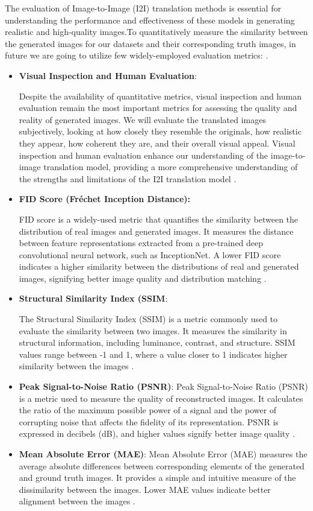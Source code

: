 \documentclass[UKenglish,12pt]{master-style}
\begin{document}
The evaluation of Image-to-Image (I2I) translation methods is essential for understanding the performance and effectiveness of these models in generating realistic and high-quality images.To quantitatively measure the similarity between the generated images for our datasets and their corresponding truth images, in future we are going to utilize few widely-employed evaluation metrics: .
\begin{itemize}

\item \textbf{Visual Inspection and Human Evaluation}:

Despite the availability of quantitative metrics, visual inspection and human evaluation remain the most important metrics for assessing the quality and reality of generated images. We will evaluate the translated images subjectively, looking at how closely they resemble the originals, how realistic they appear, how coherent they are, and their overall visual appeal. Visual inspection and human evaluation enhance our understanding of the image-to-image translation model, providing a more comprehensive understanding of the strengths and limitations of the I2I translation model \cite{I2I} .

\item \textbf{FID Score (Fréchet Inception Distance):}

FID score is a widely-used metric that quantifies the similarity between the distribution of real images and generated images. It measures the distance between feature representations extracted from a pre-trained deep convolutional neural network, such as InceptionNet. A lower FID score indicates a higher similarity between the distributions of real and generated images, signifying better image quality and distribution matching \cite{FID} .

\item \textbf{Structural Similarity Index (SSIM}:

The Structural Similarity Index (SSIM) is a metric commonly used to evaluate the similarity between two images. It measures the similarity in structural information, including luminance, contrast, and structure. SSIM values range between -1 and 1, where a value closer to 1 indicates higher similarity between the images \cite{evaluation} .

\item \textbf{Peak Signal-to-Noise Ratio (PSNR)}:
Peak Signal-to-Noise Ratio (PSNR) is a metric used to measure the quality of reconstructed images. It calculates the ratio of the maximum possible power of a signal and the power of corrupting noise that affects the fidelity of its representation. PSNR is expressed in decibels (dB), and higher values signify better image quality\cite{evaluation}  .

\item \textbf{Mean Absolute Error (MAE)}:
Mean Absolute Error (MAE) measures the average absolute differences between corresponding elements of the generated and ground truth images. It provides a simple and intuitive measure of the dissimilarity between the images. Lower MAE values indicate better alignment between the images \cite{evaluation} .

\end{itemize}
\end{document}
